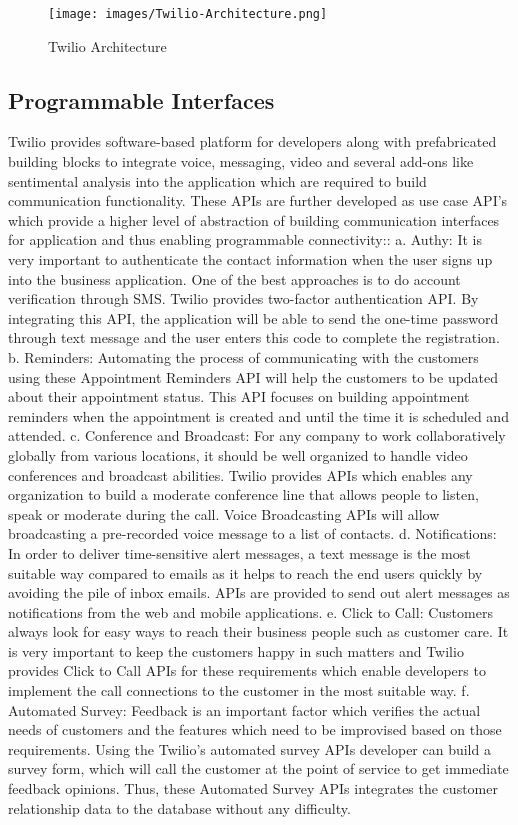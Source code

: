 {\begin{figure}[!ht]
  \centering\texttt{[image: images/Twilio-Architecture.png]}
  \caption{Twilio Architecture~\cite{hid-sp18-406-twilio-architecture-image}}
\label{f:architecture}
\end{figure}




\subsection{Programmable Interfaces}

Twilio provides software-based platform for developers along with 
prefabricated building blocks to integrate voice, messaging, video and 
several add-ons like sentimental analysis into the application which are 
required to build communication functionality. These APIs are further developed 
as use case API's which provide a higher level of abstraction of building 
communication interfaces for application and thus enabling programmable 
connectivity::
a. Authy: It is very important to authenticate the contact information when the 
user signs up into the business application. One of the best approaches is to do
account verification through SMS. Twilio provides two-factor authentication API.
By integrating this API, the application will be able to send the one-time 
password through text message and the user enters this code to complete the 
registration.  
b. Reminders: Automating the process of communicating with the customers using 
these Appointment Reminders API will help the customers to be updated about 
their appointment status. This API focuses on building appointment reminders 
when the appointment is created and until the time it is scheduled and attended.
c. Conference and Broadcast:
For any company to work collaboratively globally from various locations, it 
should be well organized to handle video conferences and broadcast abilities. 
Twilio provides APIs which enables any organization to build a moderate 
conference line that allows people to listen, speak or moderate during the call.
Voice Broadcasting APIs will allow broadcasting a pre-recorded voice message to 
a list of contacts.
d. Notifications:
In order to deliver time-sensitive alert messages, a text message is the most 
suitable way compared to emails as it helps to reach the end users quickly by 
avoiding the pile of inbox emails. APIs are provided to send out alert messages
as notifications from the web and mobile applications.
e. Click to Call:
Customers always look for easy ways to reach their business people such as 
customer care. It is very important to keep the customers happy in such matters 
and Twilio provides Click to Call APIs for these requirements which enable 
developers to implement the call connections to the customer in the most 
suitable way.
f. Automated Survey:
Feedback is an important factor which verifies the actual needs of customers and
the features which need to be improvised based on those requirements. Using the
Twilio's automated survey APIs developer can build a survey form, which will
call the customer at the point of service to get immediate feedback opinions. 
Thus, these Automated Survey APIs integrates the customer relationship data to
the database without any difficulty.

}
